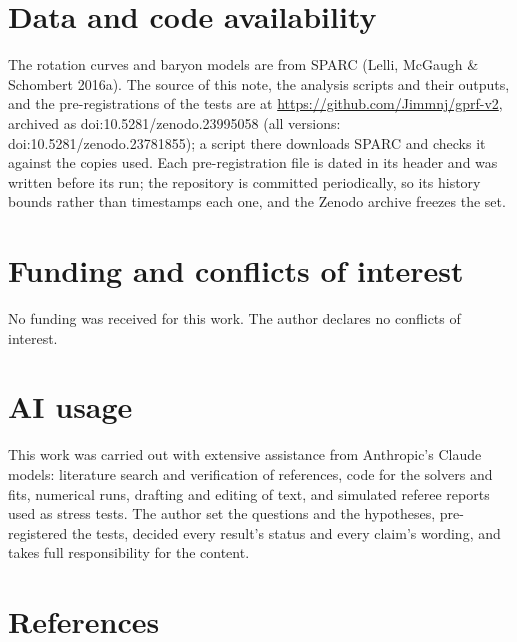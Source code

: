 \documentclass[
  10pt,
]{article}
\begin{document}
\section{Data and code availability}\label{data-code}

The rotation curves and baryon models are from SPARC (Lelli, McGaugh \& Schombert 2016a). The source of this note, the analysis scripts and their outputs, and the pre-registrations of the tests are at \url{https://github.com/Jimmnj/gprf-v2}, archived as doi:10.5281/zenodo.23995058 (all versions: doi:10.5281/zenodo.23781855); a script there downloads SPARC and checks it against the copies used. Each pre-registration file is dated in its header and was written before its run; the repository is committed periodically, so its history bounds rather than timestamps each one, and the Zenodo archive freezes the set.

\section{Funding and conflicts of interest}

No funding was received for this work. The author declares no conflicts of interest.

\section{AI usage}\label{ai-usage}

This work was carried out with extensive assistance from Anthropic's
Claude models: literature search and verification of references, code
for the solvers and fits, numerical runs, drafting and editing of text,
and simulated referee reports used as stress tests. The author set the
questions and the hypotheses, pre-registered the tests, decided every
result's status and every claim's wording, and takes full responsibility
for the content.

\section{References}\label{references}
\end{document}
